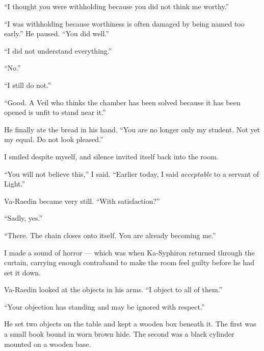 ``I thought you were withholding because you did not think me worthy.''\par

``I was withholding because worthiness is often damaged by being named too early.''
He paused. ``You did well.''\par

``I did not understand everything.''\par

``No.''\par

``I still do not.''\par

``Good. A Veil who thinks the chamber has been solved because it has been opened is unfit to stand near it.''\par

He finally ate the bread in his hand. ``You are no longer only my student. Not yet my equal. Do not look pleased.''\par

I smiled despite myself, and silence invited itself back into the room.\par

``You will not believe this,'' I said. ``Earlier today, I said \emph{acceptable} to a servant of Light.''\par

Va-Raedin became very still. ``With satisfaction?''\par

``Sadly, yes.''\par

``There. The chain closes onto itself. You are already becoming me.''\par

I made a sound of horror --- which was when Ka-Syphiron returned through the curtain, carrying enough contraband to make the room feel guilty before he had set it down.\par

Va-Raedin looked at the objects in his arms. ``I object to all of them.''\par

``Your objection has standing and may be ignored with respect.''\par

He set two objects on the table and kept a wooden box beneath it. The first was a small book bound in worn brown hide. The second was a black cylinder mounted on a wooden base.\par

